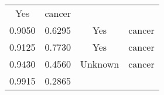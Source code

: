 \documentclass[12pt,]{article}
\begin{document}
\begin{longtable}[]{@{}cccc@{}}
\begin{minipage}[t]{0.22\columnwidth}
Yes\strut
\end{minipage} & \begin{minipage}[t]{0.16\columnwidth}\centering\strut
cancer\strut
\end{minipage}\tabularnewline
\begin{minipage}[t]{0.24\columnwidth}\centering\strut
0.9050\strut
\end{minipage} & \begin{minipage}[t]{0.26\columnwidth}\centering\strut
0.6295\strut
\end{minipage} & \begin{minipage}[t]{0.22\columnwidth}\centering\strut
Yes\strut
\end{minipage} & \begin{minipage}[t]{0.16\columnwidth}\centering\strut
cancer\strut
\end{minipage}\tabularnewline
\begin{minipage}[t]{0.24\columnwidth}\centering\strut
0.9125\strut
\end{minipage} & \begin{minipage}[t]{0.26\columnwidth}\centering\strut
0.7730\strut
\end{minipage} & \begin{minipage}[t]{0.22\columnwidth}\centering\strut
Yes\strut
\end{minipage} & \begin{minipage}[t]{0.16\columnwidth}\centering\strut
cancer\strut
\end{minipage}\tabularnewline
\begin{minipage}[t]{0.24\columnwidth}\centering\strut
0.9430\strut
\end{minipage} & \begin{minipage}[t]{0.26\columnwidth}\centering\strut
0.4560\strut
\end{minipage} & \begin{minipage}[t]{0.22\columnwidth}\centering\strut
Unknown\strut
\end{minipage} & \begin{minipage}[t]{0.16\columnwidth}\centering\strut
cancer\strut
\end{minipage}\tabularnewline
\begin{minipage}[t]{0.24\columnwidth}\centering\strut
0.9915\strut
\end{minipage} & \begin{minipage}[t]{0.26\columnwidth}\centering\strut
0.2865\strut
\end{minipage} & \begin{minipage}[t]{0.22\columnwidth}\centering\strut

\end{minipage}
\end{longtable}
\end{document}
